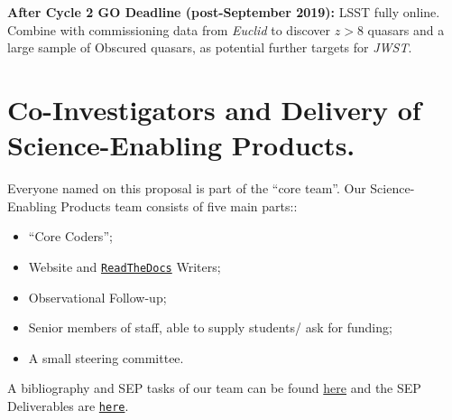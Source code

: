 \smallskip
\smallskip
\noindent
{\bf After Cycle 2 GO Deadline (post-September 2019):} 
LSST fully online. Combine with commissioning data from {\it Euclid} to
discover $z>8$ quasars and a large sample of Obscured quasars, as
potential further targets for {\it JWST}.





\section*{Co-Investigators and Delivery of Science-Enabling Products.}
Everyone named on this proposal is part of the ``core team''. 
\smallskip \smallskip
\noindent
Our Science-Enabling Products team consists of five main parts::
\begin{itemize}
    \item ``Core Coders''; 
    \item Website and \href{http://miri-mrs.readthedocs.io/en/latest/}{{\tt ReadTheDocs}} Writers; 
    \item Observational Follow-up; 
    \item Senior members of staff, able to supply students/ ask for funding; 
    \item A small steering committee. 
\end{itemize}


\smallskip
\smallskip
\noindent
A bibliography and SEP tasks of our team can be found \href{https://github.com/d80b2t/JWST_ERS/blob/master/Proposal/CoI_bios.tex}{here} and the SEP Deliverables are \href{https://github.com/d80b2t/JWST_ERS/tree/master/Deliverables}{\tt here}. 

%



